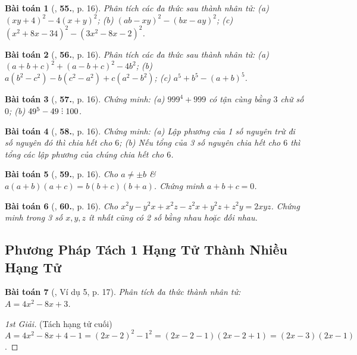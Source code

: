 \documentclass{article}
\numberwithin{equation}{section}
\newtheorem{baitoan}{Bài toán}
\DeclareRobustCommand{\divby}{%
	\mathrel{\vbox{\baselineskip.65ex\lineskiplimit0pt\hbox{.}\hbox{.}\hbox{.}}}%
}
\begin{document}
\begin{baitoan}[\cite{Tuyen_Toan_8}, \textbf{55.}, p. 16]
	Phân tích các đa thức sau thành nhân tử: (a) $(xy + 4)^2 - 4(x + y)^2$; (b) $(ab - xy)^2 - (bx - ay)^2$; (c) $(x^2 + 8x - 34)^2 - (3x^2 - 8x - 2)^2$.
\end{baitoan}

\begin{baitoan}[\cite{Tuyen_Toan_8}, \textbf{56.}, p. 16]
	Phân tích các đa thức sau thành nhân tử: (a) $(a + b + c)^2 + (a - b + c)^2 - 4b^2$; (b) $a(b^2 - c^2) - b(c^2 - a^2) + c(a^2 - b^2)$; (c) $a^5 + b^5 - (a + b)^5$.
\end{baitoan}

\begin{baitoan}[\cite{Tuyen_Toan_8}, \textbf{57.}, p. 16]
	Chứng minh: (a) $999^4 + 999$ có tận cùng bằng $3$ chữ số $0$; (b) $49^5 - 49\divby100$.
\end{baitoan}

\begin{baitoan}[\cite{Tuyen_Toan_8}, \textbf{58.}, p. 16]
	Chứng minh: (a) Lập phương của 1 số nguyên trừ đi số nguyên đó thì chia hết cho $6$; (b) Nếu tổng của 3 số nguyên chia hết cho $6$ thì tổng các lập phương của chúng chia hết cho $6$.
\end{baitoan}

\begin{baitoan}[\cite{Tuyen_Toan_8}, \textbf{59.}, p. 16]
	Cho $a\ne\pm b$ \&  $a(a + b)(a + c) = b(b + c)(b + a)$. Chứng minh $a + b + c = 0$.
\end{baitoan}

\begin{baitoan}[\cite{Tuyen_Toan_8}, \textbf{60.}, p. 16]
	Cho $x^2y - y^2x + x^2z - z^2x + y^2z + z^2y = 2xyz$. Chứng minh trong 3 số $x,y,z$ ít nhất cũng có 2 số bằng nhau hoặc đối nhau.
\end{baitoan}

\subsection{Phương Pháp Tách 1 Hạng Tử Thành Nhiều Hạng Tử}

\begin{baitoan}[\cite{Tuyen_Toan_8}, Ví dụ 5, p. 17]
	Phân tích đa thức thành nhân tử: $A = 4x^2 - 8x + 3$.
\end{baitoan}

\begin{proof}[1st Giải]
	(Tách hạng tử cuối) $A = 4x^2 - 8x + 4 - 1 = (2x - 2)^2 - 1^2 = (2x - 2 - 1)(2x - 2 + 1) = (2x - 3)(2x - 1)$.
\end{proof}
\end{document}
